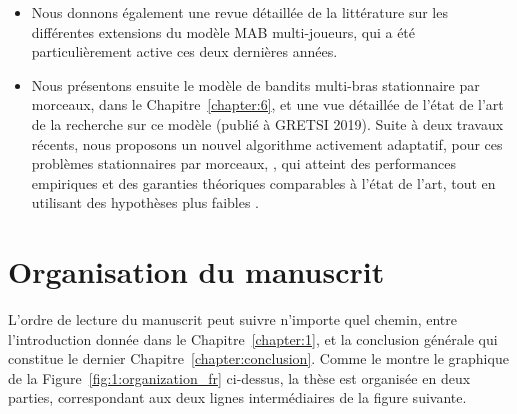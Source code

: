 \begin{resume_fr}
\begin{itemize}
    \item
    Nous donnons également une revue détaillée de la littérature sur les différentes extensions du modèle MAB multi-joueurs, qui a été particulièrement active ces deux dernières années.

    \item
    Nous présentons ensuite le modèle de bandits multi-bras stationnaire par morceaux, dans le Chapitre~\ref{chapter:6}, et une vue détaillée de l'état de l'art de la recherche sur ce modèle \cite{Besson2019GLRT,Besson2019Gretsi} (publié à GRETSI 2019).
    Suite à deux travaux récents, nous proposons un nouvel algorithme activement adaptatif, pour ces problèmes stationnaires par morceaux, \GLRklUCB, qui atteint des performances empiriques et des garanties théoriques comparables à l'état de l'art, tout en utilisant des hypothèses plus faibles .

\end{itemize}

\section*{Organisation du manuscrit}

%
L'ordre de lecture du manuscrit peut suivre n'importe quel chemin, entre l'introduction donnée dans le Chapitre~\ref{chapter:1}, et la conclusion générale qui constitue le dernier Chapitre~\ref{chapter:conclusion}.
Comme le montre le graphique de la Figure~\ref{fig:1:organization_fr} ci-dessus,
la thèse est organisée en deux parties, correspondant aux deux lignes intermédiaires de la figure suivante.


\end{resume_fr}
